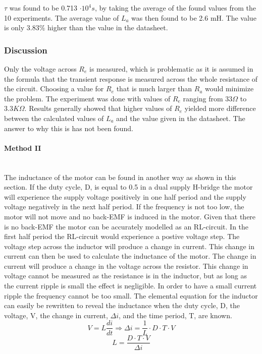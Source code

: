 $\tau$ was found to be 0.713 $\cdot 10^4 s$, by taking the average of the found values from the 10 experiments.
The average value of $L_a$ was then found to be 2.6 mH. The value is only $3.83\%$ higher than the value in the datasheet.

\subsubsection{Discussion}
Only the voltage across $R_e$ is measured, which is problematic as it is assumed in the formula that the transient response is measured across the whole resistance of the circuit. Choosing a value for $R_e$ that is much larger than $R_a$ would minimize the problem.
The experiment was done with values of $R_e$ ranging from $33\Omega$ to $3.3K\Omega$.
Results generally showed that higher values of $R_e$ yielded more difference between the calculated values of $L_a$ and the value given in the datasheet.	
The answer to why this is has not been found.


\paragraph{Method II}~\\
The inductance of the motor can be found in another way as shown in this section. 
If the duty cycle, D, is equal to 0.5 in a dual supply H-bridge the motor will experience the supply voltage positively in one half period and the supply voltage negatively in the next half period.
If the frequency is not too low, the motor will not move and no back-EMF is induced in the motor. 
Given that there is no back-EMF the motor can be accurately modelled as an RL-circuit.  
In the first half period the RL-circuit would experience a postive voltage step. 
The voltage step across the inductor will produce a change in current.
This change in current can then be used to calculate the inductance of the motor.
The change in current will produce a change in the voltage across the resistor.
This change in voltage cannot be measured as the resistance is in the inductor, but as long as the current ripple is small the effect is negligible. 
In order to have a small current ripple the frequency cannot be too small.   
The elemental equation for the inductor can easily be rewritten to reveal the inductance when the duty cycle, D, the voltage, V, the change in current, $\Delta i$, and the time period, T, are known. 
$$V = L \frac{di}{dt} \Rightarrow \Delta i = \frac{1}{L} \cdot D \cdot T \cdot V $$
$$L = \frac{D \cdot T \cdot V}{\Delta i}$$


